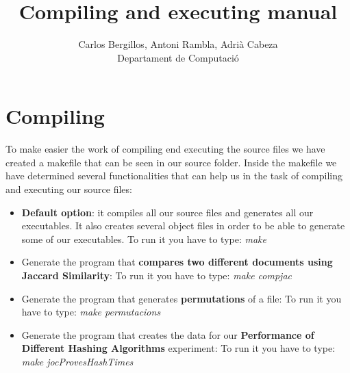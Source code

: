 \documentclass[12pt]{article}
\author{Carlos Bergillos, Antoni Rambla, Adrià Cabeza\\ Departament de Computació}
\title{Compiling and executing manual}
\begin{document}
  \maketitle  
   \newpage
   \section{Compiling}
   To make easier the work of compiling end executing the source files we have created a makefile that can be seen in our source folder. Inside the makefile we have determined several functionalities that can help us in the task of compiling and executing our source files:
   
   \begin{itemize}
   \item \textbf{Default option}: it compiles all our source files and generates all our executables. It also creates several object files in order to be able to generate some of our executables. 
   To run it you have to type: \textit{make}
   \item Generate the program that \textbf{compares two different documents using Jaccard Similarity}:
   To run it you have to type: \textit{make compjac}
  
  
   \item Generate the program that generates \textbf{permutations} of a file:
   To run it you have to type: \textit{make permutacions}
 
   
\item Generate the program that creates the data for our \textbf{Performance of Different Hashing Algorithms} experiment:
   To run it you have to type: \textit{make jocProvesHashTimes}
  

\end{itemize}
\end{document}
